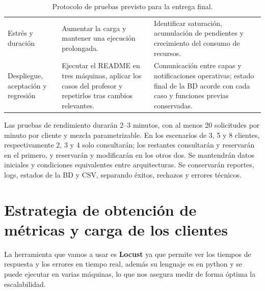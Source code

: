 \documentclass[10pt, a4paper]{article}
\begin{document}
\begin{table}[H]
\begin{tabular}{@{}p{}p{}p{}@{}}
            Estrés y duración & Aumentar la carga y mantener una ejecución prolongada. & Identificar saturación, acumulación de pendientes y crecimiento del consumo de recursos. \\
            Despliegue, aceptación y regresión & Ejecutar el README en tres máquinas, aplicar los casos del profesor y repetirlos tras cambios relevantes. & Comunicación entre capas y notificaciones operativas; estado final de la BD acorde con cada caso y funciones previas conservadas. \\
            \bottomrule
        \end{tabular}
        \caption{Protocolo de pruebas previsto para la entrega final.}
        \label{tab:protocol}
    \end{table}

    Las pruebas de rendimiento durarán 2--3 minutos, con al menos 20 solicitudes por minuto por cliente y mezcla parametrizable. En los escenarios de 3, 5 y 8 clientes, respectivamente 2, 3 y 4 solo consultarán; los restantes consultarán y reservarán en el primero, y reservarán y modificarán en los otros dos. Se mantendrán datos iniciales y condiciones equivalentes entre arquitecturas. Se conservarán reportes, logs, estados de la BD y CSV, separando éxitos, rechazos y errores técnicos.
	
	\section{Estrategia de obtención de métricas y carga de los clientes}
	\label{sec:testing}
	La herramienta que vamos a usar es \textbf{Locust} ya que permite ver los tiempos de respuesta y los errores en tiempo real, además su lenguaje es en python y se puede ejecutar en varias máquinas, lo que nos asegura medir de forma óptima la escalabilidad.
	
\end{document}
